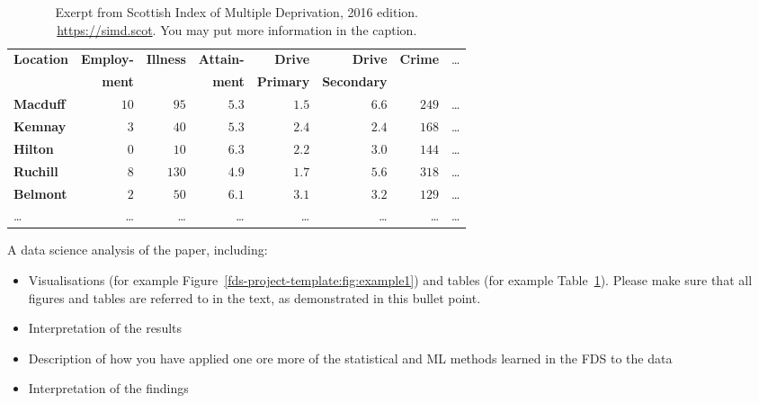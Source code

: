 \documentclass[11pt,a4paper]{article}
\begin{document}

\begin{table}[b]
  \caption{Exerpt from Scottish Index of Multiple Deprivation, 2016 edition.
    \url{https://simd.scot}. You may put more information in the caption.}
  \label{tab:example1}
\begin{tabular}{lrrrrrrr}
\hline\hline
\textbf{Location}&\textbf{Employ-}&\textbf{Illness}&\textbf{Attain-}&\textbf{Drive}  &\textbf{Drive}    &\textbf{Crime}&\dots\\
                 &\textbf{ment}   &                &\textbf{ment}   &\textbf{Primary}&\textbf{Secondary}&              &\\
\hline
\textbf{Macduff}&$10$&$ 95$&$5.3$&$1.5$&$6.6$&$249$&\dots\tabularnewline
\textbf{Kemnay}&$ 3$&$ 40$&$5.3$&$2.4$&$2.4$&$168$&\dots\tabularnewline
\textbf{Hilton}&$ 0$&$ 10$&$6.3$&$2.2$&$3.0$&$144$&\dots\tabularnewline
\textbf{Ruchill}&$ 8$&$130$&$4.9$&$1.7$&$5.6$&$318$&\dots\tabularnewline
\textbf{Belmont}&$ 2$&$ 50$&$6.1$&$3.1$&$3.2$&$129$&\dots\tabularnewline
\dots&\dots&\dots&\dots&\dots&\dots&\dots&\dots\tabularnewline
\hline
\end{tabular}
\end{table}

A data science analysis of the paper, including: 
\begin{itemize}
\item Visualisations (for example
  Figure~\ref{fds-project-template:fig:example1}) and tables (for
  example Table~\ref{tab:example1}). Please make sure that all figures
  and tables are referred to in the text, as demonstrated in this
  bullet point.
\item Interpretation of the results 
\item Description of how you have applied one ore more of the
  statistical and ML methods learned in the FDS to the data
\item Interpretation of the findings 
\end{itemize}
\end{document}
